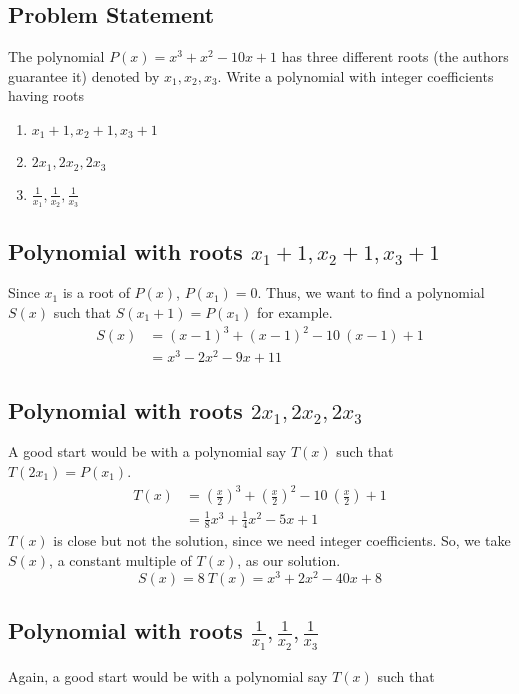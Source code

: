 \documentclass[12pt]{article}
\begin{document}
\subsection*{Problem Statement}
The polynomial $P(x) = x^3 + x^2 -10x + 1$ has three different roots (the authors guarantee it) denoted by $x_1, x_2, x_3$. Write a polynomial with integer coefficients having roots
\begin{enumerate}[label=(\alph*)]
	\item $x_1+1, x_2+1, x_3+1$
	\item $2x_1, 2x_2, 2x_3$
	\item $\frac{1}{x_1}, \frac{1}{x_2}, \frac{1}{x_3}$
\end{enumerate}

\subsection*{Polynomial with roots $x_1+1, x_2+1, x_3+1$}
Since $x_1$ is a root of $P(x)$, $P(x_1) = 0$. Thus, we want to find a polynomial $S(x)$ such that $S(x_1+1) = P(x_1)$ for example.
\begin{equation*}
	\begin{aligned}
		S(x) &= (x-1)^3 + (x-1)^2 - 10\ (x-1) + 1\\
			&= x^3 - 2x^2-9x+11
	\end{aligned}
\end{equation*}

\subsection*{Polynomial with roots $2x_1, 2x_2, 2x_3$}
A good start would be with a polynomial say $T(x)$ such that $T(2x_1) = P(x_1)$.
\begin{equation*}
	\begin{aligned}
		T(x) &= \left( \frac{x}{2} \right)^3 + \left( \frac{x}{2} \right)^2 - 10\ \left( \frac{x}{2} \right) + 1\\
		&= \frac{1}{8}x^3 + \frac{1}{4}x^2-5x+1
	\end{aligned}
\end{equation*}
$T(x)$ is close but not the solution, since we need integer coefficients. So, we take $S(x)$, a constant multiple of $T(x)$, as our solution.
\[
	S(x) = 8\ T(x) = x^3 + 2x^2 -40x + 8
\]

\subsection*{Polynomial with roots $\frac{1}{x_1}, \frac{1}{x_2}, \frac{1}{x_3}$}
Again, a good start would be with a polynomial say $T(x)$ such that 
\end{document}

